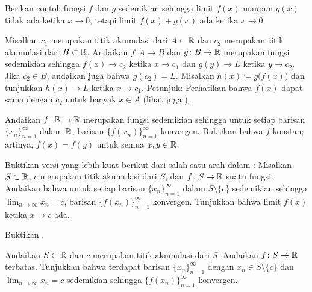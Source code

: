 \begin{exercise}
Berikan contoh fungsi $f$ dan $g$ sedemikian sehingga limit $f(x)$
maupun $g(x)$ tidak ada ketika $x \to 0$, tetapi limit $f(x)+g(x)$ ada
ketika $x \to 0$.
\end{exercise}

\begin{exercise} \label{exercise:contlimitcomposition}
Misalkan $c_1$ merupakan titik akumulasi dari $A \subset {\mathbb{R}}$ dan $c_2$
merupakan titik akumulasi dari $B \subset {\mathbb{R}}$.  Andaikan
$f \colon A \to B$ dan $g \colon B \to {\mathbb{R}}$ merupakan fungsi
sedemikian sehingga
$f(x) \to c_2$ ketika $x \to c_1$ dan
$g(y) \to L$ ketika $y \to c_2$.  Jika $c_2 \in B$, andaikan juga bahwa $g(c_2) = L$.
Misalkan $h(x) \coloneqq g\bigl(f(x)\bigr)$ dan tunjukkan
$h(x) \to L$ ketika $x \to c_1$.
Petunjuk: Perhatikan bahwa $f(x)$ dapat sama dengan $c_2$ untuk banyak $x \in A$
(lihat juga
).
\end{exercise}

\begin{exercise}
Andaikan $f \colon {\mathbb{R}} \to {\mathbb{R}}$ merupakan fungsi sedemikian sehingga untuk setiap
barisan $\{x_n\}_{n=1}^\infty$ dalam ${\mathbb{R}}$, barisan
$\bigl\{ f(x_n) \bigr\}_{n=1}^\infty$ konvergen.  Buktikan bahwa
$f$ konstan; artinya,
$f(x) = f(y)$ untuk semua $x,y \in {\mathbb{R}}$.
\end{exercise}

\begin{exercise} \label{exercise:seqflimitalt}
Buktikan versi yang lebih kuat berikut dari salah satu arah dalam
:
Misalkan $S \subset {\mathbb{R}}$, $c$ merupakan titik akumulasi dari $S$, dan $f \colon S \to
{\mathbb{R}}$ suatu fungsi.
Andaikan bahwa untuk setiap barisan $\{x_n\}_{n=1}^\infty$ dalam $S \setminus \{c\}$ sedemikian sehingga
$\lim_{n\to\infty} x_n = c$, barisan $\bigl\{ f(x_n) \bigr\}_{n=1}^\infty$ konvergen.
Tunjukkan bahwa limit $f(x)$ ketika $x \to c$ ada.
\end{exercise}

\begin{exercise}
Buktikan .
\end{exercise}

\begin{exercise}
Andaikan $S \subset {\mathbb{R}}$ dan $c$ merupakan titik akumulasi dari $S$.  Andaikan $f \colon
S \to {\mathbb{R}}$ terbatas.  Tunjukkan bahwa terdapat barisan
$\{ x_n \}_{n=1}^\infty$
dengan $x_n \in S \setminus \{ c \}$ dan $\lim_{n\to\infty} x_n = c$ sedemikian sehingga
$\bigl\{ f(x_n) \bigr\}_{n=1}^\infty$ konvergen.
\end{exercise}

